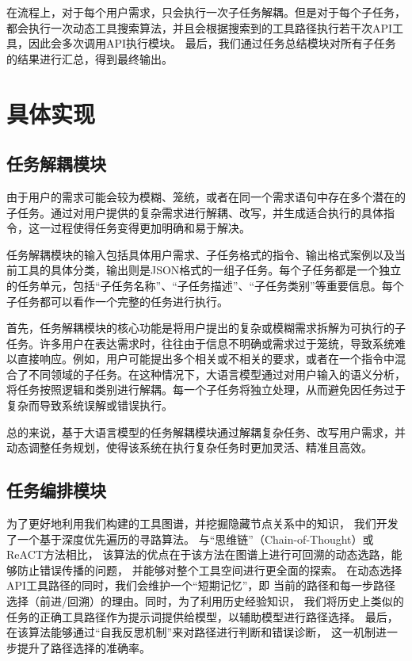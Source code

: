 在流程上，对于每个用户需求，只会执行一次子任务解耦。但是对于每个子任务，都会执行一次动态工具搜索算法，并且会根据搜索到的工具路径执行若干次API工具，因此会多次调用API执行模块。
最后，我们通过任务总结模块对所有子任务的结果进行汇总，得到最终输出。

\section{具体实现}

\subsection{任务解耦模块}

由于用户的需求可能会较为模糊、笼统，或者在同一个需求语句中存在多个潜在的子任务。通过对用户提供的复杂需求进行解耦、改写，并生成适合执行的具体指令，这一过程使得任务变得更加明确和易于解决。

任务解耦模块的输入包括具体用户需求、子任务格式的指令、输出格式案例以及当前工具的具体分类，输出则是JSON格式的一组子任务。每个子任务都是一个独立的任务单元，包括“子任务名称”、“子任务描述”、“子任务类别”等重要信息。每个子任务都可以看作一个完整的任务进行执行。

首先，任务解耦模块的核心功能是将用户提出的复杂或模糊需求拆解为可执行的子任务。许多用户在表达需求时，往往由于信息不明确或需求过于笼统，导致系统难以直接响应。例如，用户可能提出多个相关或不相关的要求，或者在一个指令中混合了不同领域的子任务。在这种情况下，大语言模型通过对用户输入的语义分析，将任务按照逻辑和类别进行解耦。每一个子任务将独立处理，从而避免因任务过于复杂而导致系统误解或错误执行。

总的来说，基于大语言模型的任务解耦模块通过解耦复杂任务、改写用户需求，并动态调整任务规划，使得该系统在执行复杂任务时更加灵活、精准且高效。


\subsection{任务编排模块}

为了更好地利用我们构建的工具图谱，并挖掘隐藏节点关系中的知识，
我们开发了一个基于深度优先遍历的寻路算法。
与“思维链”（Chain-of-Thought）或ReACT方法相比，
该算法的优点在于该方法在图谱上进行可回溯的动态选路，能够防止错误传播的问题，
并能够对整个工具空间进行更全面的探索。
在动态选择API工具路径的同时，我们会维护一个“短期记忆”，即
当前的路径和每一步路径选择（前进/回溯）的理由。同时，为了利用历史经验知识，
我们将历史上类似的任务的正确工具路径作为提示词提供给模型，以辅助模型进行路径选择。
最后，在该算法能够通过“自我反思机制”来对路径进行判断和错误诊断，
这一机制进一步提升了路径选择的准确率。

